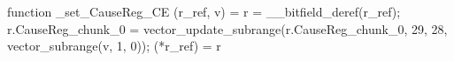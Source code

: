 function _set_CauseReg_CE (r_ref, v) = {
    r = __bitfield_deref(r_ref);
    r.CauseReg_chunk_0 = vector_update_subrange(r.CauseReg_chunk_0, 29, 28, vector_subrange(v, 1, 0));
    (*r_ref) = r
}
